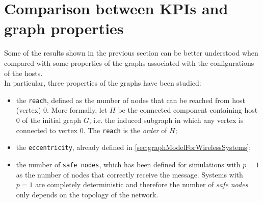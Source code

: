 \section{Comparison between KPIs and graph properties}
Some of the results shown in the previous section can be better understood when
compared with some properties of the graphs associated with the configurations
of the hosts.\\
In particular, three properties of the graphs have been studied:
\begin{itemize}
	\item the \texttt{reach}, defined as the number of nodes that can be reached
	from host (vertex) 0. More formally, let $H$ be the connected component
	containing host 0 of the initial graph $G$, i.e. the induced subgraph in
	which any vertex is connected to vertex 0. The \texttt{reach} is the
	\textit{order} of $H$;
	\item the \texttt{eccentricity}, already defined in \ref{sec:graphModelForWirelessSystems};
	\item the number of \texttt{safe nodes}, which has been defined for
	simulations with $p=1$ as the number of nodes that correctly receive the
	message. Systems with $p=1$ are completely deterministic and therefore the
	number of \textit{safe nodes} only depends on the topology of the network.
\end{itemize}
